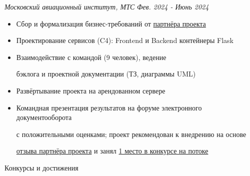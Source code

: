 \documentclass[14pt, a4paper, oneside]{extarticle}
\begin{document}
\begin{flushleft}
	\vspace{-1\intextsep}
	\quad
	\textit{Московский авиационный институт, МТС}
	\hfill
	\textit{\small Фев. 2024 - Июнь 2024}
\end{flushleft}


\begin{itemize}
	\vspace{-2\intextsep}
    \item Сбор и формализация бизнес-требований от \href{https://vk.ru/kearkhipov}{партнёра проекта}
    \vspace{-0.8\intextsep}
    \item Проектирование сервисов (C4): Frontend и Backend контейнеры Flask 
	\vspace{-0.8\intextsep}
    \item Взаимодействие с командой (9 человек), ведение 
    
    \vspace{-0.5\intextsep}
    бэклога и проектной документации (ТЗ, диаграммы UML)
    \vspace{-0.8\intextsep}
    \item Развёртывание проекта на арендованном сервере
    \vspace{-0.8\intextsep}
    \item Командная презентация результатов на форуме электронного документооборота
    
    \vspace{-0.5\intextsep}
    с положительными оценками; проект рекомендован к внедрению на основе
    
    \vspace{-0.5\intextsep}
 	\href{https://github.com/Crazy5202/job_application_form/tree/main/portfolio/EDMS/%D0%9E%D1%82%D0%B7%D1%8B%D0%B2_%D0%B2%D0%BD%D0%B5%D0%B4%D1%80%D0%B5%D0%BD%D0%B8%D0%B5.pdf}{отзыва партнёра проекта} и занял \href{https://github.com/Crazy5202/job_application_form/tree/main/portfolio/EDMS/%D0%9F%D0%BE%D0%B1%D0%B5%D0%B4%D0%B8%D1%82%D0%B5%D0%BB%D1%8C_%D0%A6%D0%9A.pdf}{1 место в конкурсе на потоке}
\end{itemize}


\pagebreak


\begin{flushleft}
	\vspace{-\intextsep}
	\large Конкурсы и достижения
\end{flushleft}
\end{document}
